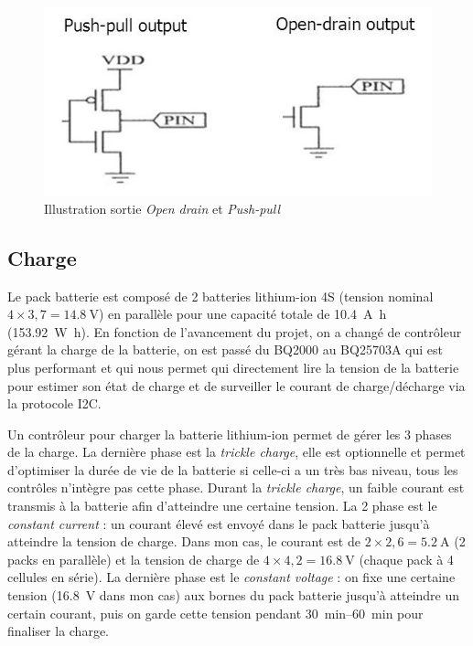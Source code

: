 \documentclass[a4paper, 12pt, sffamily]{report}
\begin{document}
\begin{figure}[H]
\centering
\includegraphics[scale=0.55]{figures/screenshots/opendrain_pushpull.png}
\caption{Illustration sortie \emph{Open drain} et \emph{Push-pull}} 
\label{fig:opendrain_pushpull}
\end{figure}

\subsection{Charge}
Le pack batterie est composé de 2 batteries lithium-ion 4S (tension nominal $4\times3,7=\SI{14.8}{\volt}$) en parallèle pour une capacité totale de \SI{10.4}{\ampere\hour} (\SI{153.92}{\watt\hour}). En fonction de l’avancement du projet, on a changé de contrôleur gérant la charge de la batterie, on est passé du BQ2000 au BQ25703A qui est plus performant et qui nous permet qui directement lire la tension de la batterie pour estimer son état de charge et de surveiller le courant de charge/décharge via la protocole I2C.

Un contrôleur pour charger la batterie lithium-ion permet de gérer les 3 phases de la charge. La dernière phase est la \emph{trickle charge}, elle est optionnelle et permet d’optimiser la durée de vie de la batterie si celle-ci a un très bas niveau, tous les contrôles n’intègre pas cette phase. Durant la \emph{trickle charge}, un faible courant est transmis à la batterie afin d’atteindre une certaine tension. La 2\ieme{} phase est le \emph{constant current} : un courant élevé est envoyé dans le pack batterie jusqu’à atteindre la tension de charge. Dans mon cas, le courant est de $2\times2,6 = \SI{5.2}{\ampere}$ (2 packs en parallèle) et la tension de charge de $4\times4,2 = \SI{16.8}{\volt}$ (chaque pack à 4 cellules en série). La dernière phase est le \emph{constant voltage} : on fixe une certaine tension (\SI{16.8}{\volt} dans mon cas) aux bornes du pack batterie jusqu’à atteindre un certain courant, puis on garde cette tension pendant \SIrange{30}{60}{\minute} pour finaliser la charge.
\end{document}
